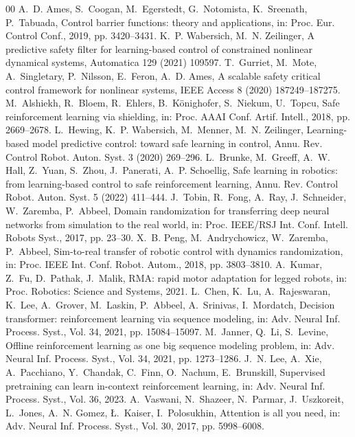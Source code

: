 \documentclass[final,5p,times,twocolumn]{elsarticle}
\begin{document}
\begin{thebibliography}{00}
 A.~D. Ames, S.~Coogan, M.~Egerstedt, G.~Notomista, K.~Sreenath, P.~Tabuada, Control barrier functions: theory and applications, in: Proc. Eur. Control Conf., 2019, pp. 3420--3431.
 K.~P. Wabersich, M.~N. Zeilinger, A predictive safety filter for learning-based control of constrained nonlinear dynamical systems, Automatica 129 (2021) 109597.
 T.~Gurriet, M.~Mote, A.~Singletary, P.~Nilsson, E.~Feron, A.~D. Ames, A scalable safety critical control framework for nonlinear systems, IEEE Access 8 (2020) 187249--187275.
 M.~Alshiekh, R.~Bloem, R.~Ehlers, B.~K\"onighofer, S.~Niekum, U.~Topcu, Safe reinforcement learning via shielding, in: Proc. AAAI Conf. Artif. Intell., 2018, pp. 2669--2678.
 L.~Hewing, K.~P. Wabersich, M.~Menner, M.~N. Zeilinger, Learning-based model predictive control: toward safe learning in control, Annu. Rev. Control Robot. Auton. Syst. 3 (2020) 269--296.
 L.~Brunke, M.~Greeff, A.~W. Hall, Z.~Yuan, S.~Zhou, J.~Panerati, A.~P. Schoellig, Safe learning in robotics: from learning-based control to safe reinforcement learning, Annu. Rev. Control Robot. Auton. Syst. 5 (2022) 411--444.
 J.~Tobin, R.~Fong, A.~Ray, J.~Schneider, W.~Zaremba, P.~Abbeel, Domain randomization for transferring deep neural networks from simulation to the real world, in: Proc. IEEE/RSJ Int. Conf. Intell. Robots Syst., 2017, pp. 23--30.
 X.~B. Peng, M.~Andrychowicz, W.~Zaremba, P.~Abbeel, Sim-to-real transfer of robotic control with dynamics randomization, in: Proc. IEEE Int. Conf. Robot. Autom., 2018, pp. 3803--3810.
 A.~Kumar, Z.~Fu, D.~Pathak, J.~Malik, RMA: rapid motor adaptation for legged robots, in: Proc. Robotics: Science and Systems, 2021.
 L.~Chen, K.~Lu, A.~Rajeswaran, K.~Lee, A.~Grover, M.~Laskin, P.~Abbeel, A.~Srinivas, I.~Mordatch, Decision transformer: reinforcement learning via sequence modeling, in: Adv. Neural Inf. Process. Syst., Vol. 34, 2021, pp. 15084--15097.
 M.~Janner, Q.~Li, S.~Levine, Offline reinforcement learning as one big sequence modeling problem, in: Adv. Neural Inf. Process. Syst., Vol. 34, 2021, pp. 1273--1286.
 J.~N. Lee, A.~Xie, A.~Pacchiano, Y.~Chandak, C.~Finn, O.~Nachum, E.~Brunskill, Supervised pretraining can learn in-context reinforcement learning, in: Adv. Neural Inf. Process. Syst., Vol. 36, 2023.
 A.~Vaswani, N.~Shazeer, N.~Parmar, J.~Uszkoreit, L.~Jones, A.~N. Gomez, {\L}.~Kaiser, I.~Polosukhin, Attention is all you need, in: Adv. Neural Inf. Process. Syst., Vol. 30, 2017, pp. 5998--6008.

\end{thebibliography}
\end{document}
